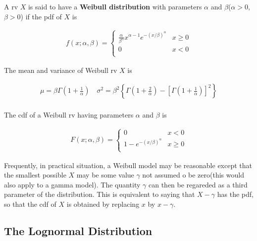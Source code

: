 \begin{definition}
    A rv $X$ is said to have a \textbf{Weibull distribution} with parameters $\alpha$ and $\beta$($\alpha>0$, $\beta>0$) if the pdf of $X$ is 

    \begin{align*}
        f(x;\alpha,\beta) = \left\{\begin{array}{cl}
            \frac{\alpha}{\beta^\alpha} x^{\alpha - 1} e^{-(x/\beta)^\alpha} & x\geq 0 \\
            0 & x < 0 \\
        \end{array}\right.
    \end{align*}

    The mean and variance of Weibull rv $X$ is

    \begin{align*}
        \mu = \beta\Gamma\left(1 + \frac{1}{\alpha}\right)\quad \sigma^2 = \beta^2\left\{\Gamma\left(1 + \frac{2}{\alpha}\right) - \left[\Gamma\left(1 + \frac{1}{\alpha}\right)\right]^2\right\} \\
    \end{align*}

    The cdf of a Weibull rv having parameters $\alpha$ and $\beta$ is

    \begin{align*}
        F(x;\alpha,\beta) = \left\{\begin{array}{cl}
            0 & x < 0\\
            1 - e^{-(x/\beta) ^ \alpha} & x\geq 0\\
        \end{array}\right.
    \end{align*}

    Frequently, in practical situation, a Weibull model may be reasonable except that the smallest possible $X$ may be some value $\gamma$ not assumed o be zero(this would also apply to a gamma model). The quantity $\gamma$ can then be regareded as a third parameter of the distribution. This is equivalent to saying that $X-\gamma$ has the pdf, so that the cdf of $X$ is obtained by replacing $x$ by $x-\gamma$.
\end{definition}

\subsection{The Lognormal Distribution}

